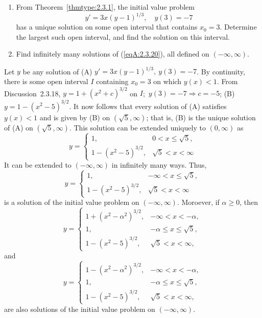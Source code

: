 \documentclass{ximera}
\begin{document}
\begin{problem}\label{exer:2.3.20}
\begin{enumerate}
\item %
 From Theorem~\ref{thmtype:2.3.1},
the initial value problem
\begin{equation}\label{eqA:2.3.20}
 y'=3x(y-1)^{1/3}, \quad y(3)=-7
\end{equation}
 has a unique solution on some open interval that contains $x_0=3$.
Determine
the largest such open interval, and find the solution on this interval.
\item %
 Find infinitely many solutions of (\ref{eqA:2.3.20}), all defined
on
$(-\infty,\infty)$.
\end{enumerate}



\begin{solution}
    Let $y$ be any solution of (A) $y'=3x(y-1)^{1/3},\ y(3)=-7$.
By continuity, there is some open interval $I$ containing  $x_0=3$
on which $y(x)<1$. From
Discussion~2.3.18,
 $y=1+(x^2+c)^{3/2}$ on $I$;\ $y(3)=-7\Rightarrow c=-5$;\;
(B) $y=1-(x^2-5)^{3/2}$.  It now follows that every solution of (A)
satisfies $y(x)<1$
and is given by (B) on $(\sqrt5,\infty)$; that is,
(B) is the unique solution of (A) on
$(\sqrt5,\infty)$.
 This solution can be extended uniquely to
$(0,\infty)$ as
$$
y=
\left\{
\begin{array}{cl}
1, & 0< x\le\sqrt5,\\
1-(x^2-5)^{3/2}, & \sqrt5<x<\infty
\end{array}\right.
$$
It can be extended to $(-\infty,\infty)$ in infinitely many ways.
Thus,
$$
y= \left\{
\begin{array}{cl}
 1, &-\infty< x\le\sqrt5,\\
1-(x^2-5)^{3/2},& \sqrt5<x<\infty
\end{array} \right.$$
is a solution of the initial value problem on $(-\infty,\infty)$.
Moroever, if
$\alpha\geq 0$, then
$$
y= \left\{
\begin{array}{cl}
 1+(x^2-\alpha^2)^{3/2},& -\infty<x<-\alpha, \\
1, & -\alpha\leq x\le\sqrt5,\\
1-(x^2-5)^{3/2},& \sqrt5<x<\infty,
\end{array}\right. $$
and
$$
y= \left\{
\begin{array}{cl}
 1-(x^2-\alpha^2)^{3/2},& -\infty<x<-\alpha, \\
1, & -\alpha\leq x\leq\sqrt5,\\
1-(x^2-5)^{3/2},& \sqrt5<x<\infty,
\end{array} \right.
$$
are also solutions of the initial value problem  on
$(-\infty,\infty)$.
\end{solution}
\end{problem}
\end{document}
